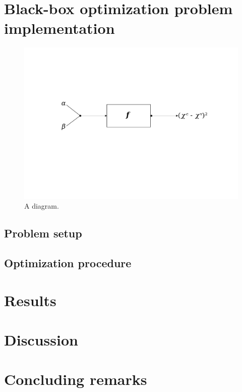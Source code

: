 \section{Black-box optimization problem implementation}
\begin{figure}
    \centering
    \includegraphics[scale=0.35]{figuras/capitulo-5/black-box-function.pdf}
    \caption{A diagram.}
    \label{fig:black-box-function}
\end{figure}

\subsection{Problem setup}
\subsection{Optimization procedure}

\section{Results}

\section{Discussion}

\section{Concluding remarks}